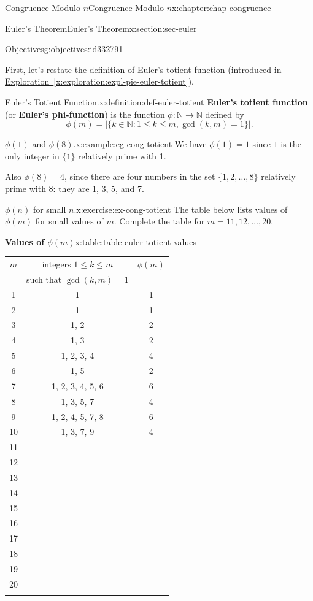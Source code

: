 \documentclass[oneside,10pt,]{book}
\newcommand{\tabularfont}{\relax}
\newcommand{\xreffont}{\relax}
\newcommand{\terminology}[1]{\textbf{#1}}
\numberwithin{equation}{section}
\newcommand{\hrulemedium}{\noalign{\hrule height 0.07em}}
\begin{document}
\begin{chapterptx}{Congruence Modulo \(n\)}{}{Congruence Modulo \(n\)}{}{}{x:chapter:chap-congruence}
\begin{sectionptx}{Euler's Theorem}{}{Euler's Theorem}{}{}{x:section:sec-euler}
\begin{objectives}{Objectives}{g:objectives:id332791}
\begin{itemize}[label=\textbullet]
\end{itemize}
\end{objectives}
First, let's restate the definition of Euler's totient function (introduced in \hyperref[x:exploration:expl-pie-euler-totient]{Exploration~{\xreffont\ref{x:exploration:expl-pie-euler-totient}}}).%
\begin{definition}{Euler's Totient Function.}{x:definition:def-euler-totient}%
\terminology{Euler's totient function} (or \terminology{Euler's phi-function}) is the function \(\phi: \mathbb{N} \rightarrow \mathbb{N}\) defined by%
\begin{equation*}
\phi(m) = \bigl|\{k \in \mathbb{N} : 1 \leq k \leq m, \gcd(k,m) = 1\}\bigr|\text{.}
\end{equation*}
\label{g:notation:id333211}%
\end{definition}
\begin{example}{\(\phi(1)\) and \(\phi(8)\).}{x:example:eg-cong-totient}%
We have \(\phi(1) = 1\) since \(1\) is the only integer in \(\{1\}\) relatively prime with 1.%
\par
Also \(\phi(8) = 4\), since there are four numbers in the set \(\{1,2,\ldots,8\}\) relatively prime with 8: they are 1, 3, 5, and 7.%
\end{example}
\begin{inlineexercise}{\(\phi(n)\) for small \(n\).}{x:exercise:ex-cong-totient}%
The table below lists values of \(\phi(m)\) for small values of \(m\). Complete the table for \(m = 11, 12, \ldots, 20\).%
\begin{tableptx}{\textbf{Values of \(\phi(m)\)}}{x:table:table-euler-totient-values}{}%
\centering
{\tabularfont%
\begin{tabular}{ccc}
\(m\)&integers \(1 \leq k \leq m\)&\(\phi(m)\)\tabularnewline[0pt]
&such that \(\gcd(k,m)=1\)&\tabularnewline\hrulemedium
1&1&1\tabularnewline[0pt]
2&1&1\tabularnewline[0pt]
3&1, 2&2\tabularnewline[0pt]
4&1, 3&2\tabularnewline[0pt]
5&1, 2, 3, 4&4\tabularnewline\hrulemedium
6&1, 5&2\tabularnewline[0pt]
7&1, 2, 3, 4, 5, 6&6\tabularnewline[0pt]
8&1, 3, 5, 7&4\tabularnewline[0pt]
9&1, 2, 4, 5, 7, 8&6\tabularnewline[0pt]
10&1, 3, 7, 9&4\tabularnewline\hrulemedium
11&&\tabularnewline[0pt]
12&&\tabularnewline[0pt]
13&&\tabularnewline[0pt]
14&&\tabularnewline[0pt]
15&&\tabularnewline\hrulemedium
16&&\tabularnewline[0pt]
17&&\tabularnewline[0pt]
18&&\tabularnewline[0pt]
19&&\tabularnewline[0pt]
20&&\tabularnewline\hrulemedium
\end{tabular}
}%
\end{tableptx}%

\end{inlineexercise}
\end{sectionptx}
\end{chapterptx}
\end{document}
